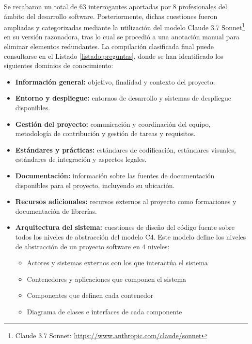 Se recabaron un total de 63 interrogantes aportadas por 8 profesionales del ámbito del desarrollo software. Posteriormente, dichas cuestiones fueron ampliadas y categorizadas mediante la utilización del modelo Claude 3.7 Sonnet\footnote{Claude 3.7 Sonnet: \url{https://www.anthropic.com/claude/sonnet}} en su versión razonadora, tras lo cual se procedió a una anotación manual para eliminar elementos redundantes. La compilación clasificada final puede consultarse en el Listado \ref{listado:preguntas}, donde se han identificado los siguientes dominios de conocimiento:


\begin{itemize}
\item\textbf{Información general: }objetivo, finalidad y contexto del proyecto.
\item\textbf{Entorno y despliegue: }entornos de desarrollo y sistemas de despliegue disponibles.
\item\textbf{Gestión del proyecto: }comunicación y coordinación del equipo, metodología de contribución y gestión de tareas y requisitos.
\item\textbf{Estándares y prácticas: }estándares de codificación, estándares visuales, estándares de integración y aspectos legales.
\item\textbf{Documentación: }información sobre las fuentes de documentación disponibles para el proyecto, incluyendo su ubicación.
\item\textbf{Recursos adicionales: }recursos externos al proyecto como formaciones y documentación de librerías.
\item\textbf{Arquitectura del sistema: }cuestiones de diseño del código fuente sobre todos los niveles de abstracción del modelo C4\cite{noauthor_c4_nodate}. Este modelo define los niveles de abstracción de un proyecto software en 4 niveles:
\begin{itemize}
\item Actores y sistemas externos con los que interactúa el sistema
\item Contenedores y aplicaciones que componen el sistema
\item Componentes que definen cada contenedor
\item Diagrama de clases e interfaces de cada componente
\end{itemize}
\end{itemize}

